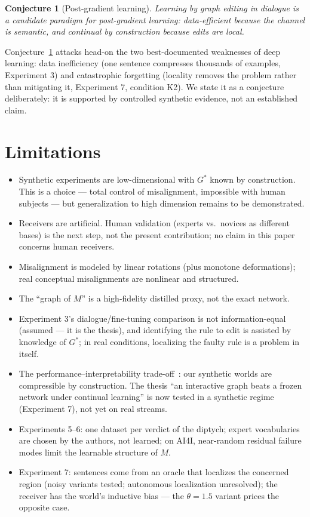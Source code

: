 \documentclass[10pt]{article}
\theoremstyle{definition}
\theoremstyle{plain}
\newtheorem{conjecture}{Conjecture}
\begin{document}
\begin{conjecture}[Post-gradient learning]
\label{conj:postgradient}
Learning by graph editing in dialogue is a candidate paradigm for post-gradient learning: data-efficient because the channel is semantic, and continual by construction because edits are local.
\end{conjecture}

Conjecture~\ref{conj:postgradient} attacks head-on the two best-documented weaknesses of deep learning: data inefficiency (one sentence compresses thousands of examples, Experiment 3) and catastrophic forgetting (locality removes the problem rather than mitigating it, Experiment 7, condition K2). We state it as a conjecture deliberately: it is supported by controlled synthetic evidence, not an established claim.

\section{Limitations}
\label{sec:limits}

\begin{itemize}
  \item Synthetic experiments are low-dimensional with $G^\ast$ known by construction. This is a choice --- total control of misalignment, impossible with human subjects --- but generalization to high dimension remains to be demonstrated.
  \item Receivers are artificial. Human validation (experts vs.\ novices as different bases) is the next step, not the present contribution; no claim in this paper concerns human receivers.
  \item Misalignment is modeled by linear rotations (plus monotone deformations); real conceptual misalignments are nonlinear and structured.
  \item The ``graph of $M$'' is a high-fidelity distilled proxy, not the exact network.
  \item Experiment 3's dialogue/fine-tuning comparison is not information-equal (assumed --- it is the thesis), and identifying the rule to edit is assisted by knowledge of $G^\ast$; in real conditions, localizing the faulty rule is a problem in itself.
  \item The performance--interpretability trade-off~\citep{rudin2019stop}: our synthetic worlds are compressible by construction. The thesis ``an interactive graph beats a frozen network under continual learning'' is now tested in a synthetic regime (Experiment 7), not yet on real streams.
  \item Experiments 5--6: one dataset per verdict of the diptych; expert vocabularies are chosen by the authors, not learned; on AI4I, near-random residual failure modes limit the learnable structure of $M$.
  \item Experiment 7: sentences come from an oracle that localizes the concerned region (noisy variants tested; autonomous localization unresolved); the receiver has the world's inductive bias --- the $\theta = 1.5$ variant prices the opposite case.
\end{itemize}
\end{document}
